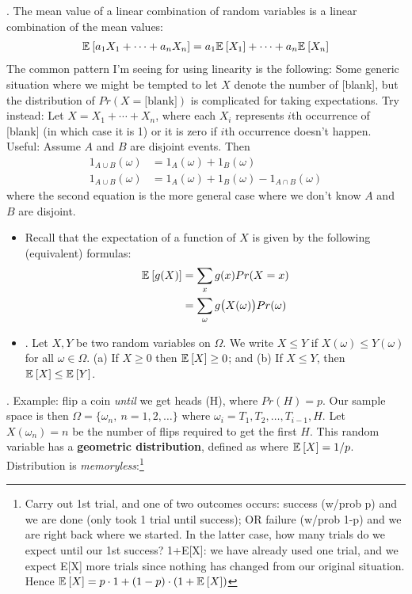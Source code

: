 \documentclass[12pt]{article}
\newcommand{\myspace}{\vspace{2\bigskipamount}}
\newcommand\p{\Needspace{12\baselineskip} \noindent}
\begin{document}
\myspace
\p {}. The mean value of a linear combination of random variables is a linear combination of the mean values:
\begin{align}
\mathbb{E}_{}\left[a_1X_1 + \cdots + a_nX_n\right] = a_1\mathbb{E}_{}\left[X_1\right] + \cdots + a_n \mathbb{E}_{}\left[X_n\right]
\end{align}
The common pattern I'm seeing for using linearity is the following: Some generic situation where we might be tempted to let $X$ denote the number of [blank], but the distribution of $Pr(X = \text{[blank]})$ is complicated for taking expectations. Try instead: Let $X = X_1 + \cdots + X_n$, where each $X_i$ represents $i$th occurrence of [blank] (in which case it is 1) or it is zero if $i$th occurrence doesn't happen. Useful: Assume $A$ and $B$ are disjoint events. Then
\begin{align}
1_{A \cup B}(\omega) &= 1_A(\omega) + 1_B(\omega) \\
1_{A \cup B}(\omega) &= 1_A(\omega) + 1_B(\omega) - 1_{A \cap B}(\omega)
\end{align}
where the second equation is the more general case where we don't know $A$ and $B$ are disjoint.
\begin{itemize}
	
	\item Recall that the expectation of a function of $X$ is given by the following (equivalent) formulas:
	\begin{align}
	\mathbb{E}_{}\left[g(X)\right] &= \sum_x g(x) Pr(X = x) \\
	&= \sum_\omega g\big(X(\omega)\big) Pr(\omega)
	\end{align}
	
	\item {}. Let $X, Y$ be two random variables on $\Omega$. We write $X \le Y$ if $X(\omega) \le Y(\omega)$ for all $\omega \in \Omega$. (a) If $X \ge 0$ then $\mathbb{E}_{}\left[X\right] \ge 0$; and (b) If $X \le Y$, then $\mathbb{E}_{}\left[X\right] \le \mathbb{E}_{}\left[Y\right]$. 
\end{itemize}
	
\myspace
\p {}. Example: flip a coin \textit{until} we get heads (H), where $Pr(H) = p$. Our sample space is then $\Omega = \{\omega_n, ~ n = 1, 2, \ldots\}$ where $\omega_i= T_1, T_2, \ldots, T_{i-1}, H$. Let $X(\omega_n) = n$ be the number of flips required to get the first $H$. This random variable has a \textbf{geometric distribution}, defined as 
where $\mathbb{E}_{}\left[X\right] = 1/p$. Distribution is \textit{memoryless}:\footnote{Carry out 1st trial, and one of two outcomes occurs:  success (w/prob p) and we are done (only took 1 trial until success); OR failure (w/prob 1-p) and we are right back where we started. In the latter case, how many trials do we expect until our 1st success? 1+E[X]: we have already used one trial, and we expect E[X] more trials since nothing has changed from our original situation. Hence $\mathbb{E}_{}\left[X\right] = p \cdot 1 + (1 - p) \cdot (1 + \mathbb{E}_{}\left[X\right]) $} 
\end{document}
